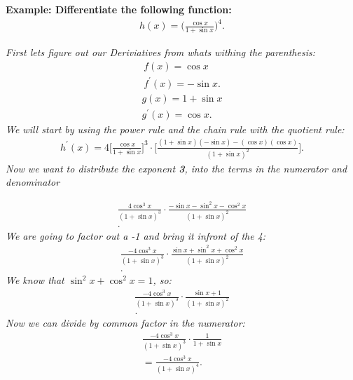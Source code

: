 \documentclass{report}
\begin{document}
  \bigbreak \noindent 
  \begin{mdframed}
    \textbf{Example: Differentiate the following function:}
    \begin{align*}
      h(x) = \bigg( \frac{ \cos{x}}{1+ \sin{x}}\bigg)^4
    .\end{align*}
  \end{mdframed}
  \bigbreak \noindent 
  \textit{First lets figure out our Deriviatives from whats withing the parenthesis:}
  \begin{align*}
    f(x) = \cos{x} \\
    f ^{\prime}(x) = - \sin{x}
  .\end{align*}
  \begin{align*}
    g(x) = 1+ \sin{x} \\ 
    g ^{\prime}(x) =  \cos{x}
  .\end{align*}
  \bigbreak \noindent 
  \textit{We will start by using the power rule and the chain rule with the quotient rule:}
  \begin{align*}
    h ^{\prime}(x) = 4 \bigg[\frac{\cos{x}}{1+\sin{x}}\bigg]^3  \cdot \bigg[ \frac{(1+ \sin{x})(- \sin{x}) - ( \cos{x})( \cos{x})}{(1+ \sin{x})^2}\bigg]
  .\end{align*}
  \bigbreak \noindent \bigbreak \noindent 
  \textit{Now we want to distribute the exponent \textbf{\textit{3}}, into the terms in the numerator and denominator}

  \begin{align*}
   \frac{4\cos^{3}{x}}{(1+\sin{x})^{3}} \cdot \frac{-\sin{x}-\sin^{2}{x}-\cos^{2}{x}}{(1+\sin{x})^2}  \\ 
  .\end{align*}
  \bigbreak \noindent 
  \textit{We are going to factor out a -1 and bring it infront of the 4:}
  \begin{align*}
   \frac{-4\cos^{3}{x}}{(1+\sin{x})^{3}} \cdot \frac{\sin{x}+\sin^{2}{x}+\cos^{2}{x}}{(1+\sin{x})^2}  \\ 
  .\end{align*}
  \bigbreak \noindent 
  \textit{We know that $\sin^{2}{x} + \cos^{2}{x} =1$, so:}
  \begin{align*}
   \frac{-4\cos^{3}{x}}{(1+\sin{x})^{3}} \cdot \frac{\sin{x}+1}{(1+\sin{x})^2}  \\ 
  .\end{align*}
  \bigbreak \noindent 
  \textit{Now we can divide by common factor in the numerator:}
  \begin{align*}
    \frac{-4\cos^{3}{x}}{(1+\sin{x})^{3}} \cdot \frac{1}{1+\sin{x}} \\ 
    = \frac{-4\cos^{3}{x}}{(1+\sin{x})^{4}} 
  .\end{align*}
\end{document}
